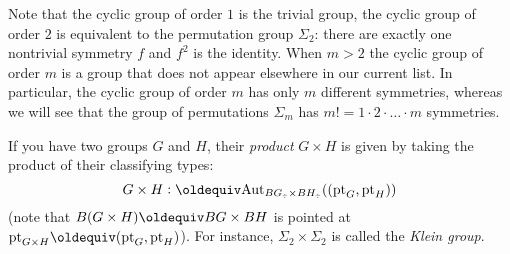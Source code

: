 \begin{example}



Note that the cyclic group of order $1$ is the trivial group, the cyclic group of order $2$ is equivalent to the permutation group $\Sigma_2$: there are exactly one nontrivial symmetry $f$ and $f^2$ is the identity.  When $m>2$ the cyclic group of order $m$ is a group that does not appear elsewhere in our current list.  In particular, the cyclic group of order $m$ has only $m$ different symmetries, whereas we will see that the group of permutations $\Sigma_m$ has $m!=1\cdot 2\cdot\dots\cdot m$ symmetries.
\end{example}

\begin{example}\label{ex:productofgroups}
  If you have two groups $G$ and $H$, their {\em product} $G\times H$ is given by taking the product of their classifying types:
$$G\times H\defequi\aut_{BG_\div\times BH_\div}((\pt_G,\pt_H))$$
(note that $B(G\times H)\oldequiv BG\times BH$ is pointed at $\pt_{G\times H}\oldequiv(\pt_G,\pt_H)$).  
For instance, $\Sigma_2\times\Sigma_2$ is called the {\em Klein group}.
\end{example}

